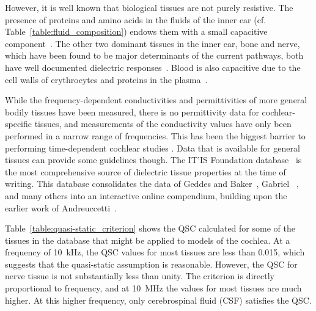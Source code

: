 However, it is well known that biological tissues are not purely resistive. The
presence of proteins and amino acids in the fluids of the inner ear (cf.
Table~\ref{table:fluid_composition}) endows them with a small capacitive
component~\cite{grimnes2000}. The other two dominant tissues in the inner ear,
bone and nerve, which have been found to be major determinants of the current
pathways, both have well documented dielectric
responses~\cite{williams1996,gabriel1996b,brown2001}. Blood is also capacitive
due to the cell walls of erythrocytes and proteins in the
plasma~\cite{grimnes2000}.

While the frequency-dependent conductivities and permittivities of more general
bodily tissues have been measured, there is no permittivity data for
cochlear-specific tissues, and measurements of the conductivity values have only
been performed in a narrow range of frequencies. This has been the biggest
barrier to performing time-dependent cochlear studies \insilico. Data that is
available for general tissues can provide some guidelines though. The IT'IS
Foundation database~\cite{hasgall2015} is the most comprehensive source of
dielectric tissue properties at the time of writing. This database consolidates
the data of Geddes and Baker~\cite{geddes1967}, Gabriel
\etal{}~\cite{gabriel1996a,gabriel1996b,gabriel1996c}, and many others into an
interactive online compendium, building upon the earlier work of
Andreuccetti~\cite{andreuccetti2000}.

Table~\ref{table:quasi-static_criterion} shows the QSC calculated for some of
the tissues in the database that might be applied to models of the cochlea. At a
frequency of 10~kHz, the QSC values for most tissues are less than 0.015, which
suggests that the quasi-static assumption is reasonable. However, the QSC for
nerve tissue is not substantially less than unity. The criterion is directly
proportional to frequency, and at 10~MHz the values for most tissues are much
higher. At this higher frequency, only cerebrospinal fluid (CSF) satisfies the
QSC.

